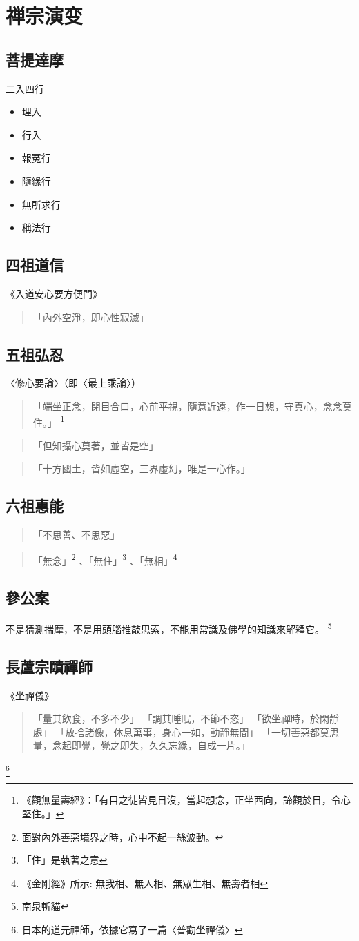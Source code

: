 \section{禅宗演变}

\subsection{菩提達摩}
二入四行
\begin{itemize}
  \item 理入
  \item 行入
\end{itemize}
\begin{itemize}
  \item 報冤行
  \item 隨緣行
  \item 無所求行
  \item 稱法行
\end{itemize}
\subsection{四祖道信}
《入道安心要方便門》
\begin{quote}
  「內外空淨，即心性寂滅」
\end{quote}
\subsection{五祖弘忍}
〈修心要論〉（即〈最上乘論〉）
\begin{quote}
  「端坐正念，閉目合口，心前平視，隨意近遠，作一日想，守真心，念念莫住。」
  \footnote{《觀無量壽經》：「有目之徒皆見日沒，當起想念，正坐西向，諦觀於日，令心堅住。」}
\end{quote}
\begin{quote}
  「但知攝心莫著，並皆是空」
\end{quote}
\begin{quote}
  「十方國土，皆如虛空，三界虛幻，唯是一心作。」
\end{quote}
\subsection{六祖惠能}
\begin{quote}
  「不思善、不思惡」
\end{quote}
\begin{quote}
  「無念」\footnote{面對內外善惡境界之時，心中不起一絲波動。}
  、「無住」\footnote{「住」是執著之意}
  、「無相」\footnote{《金剛經》所示: 無我相、無人相、無眾生相、無壽者相}
\end{quote}
\subsection{參公案}
不是猜測揣摩，不是用頭腦推敲思索，不能用常識及佛學的知識來解釋它。
\footnote{南泉斬貓}
\subsection{長蘆宗賾禪師}
《坐禪儀》
\begin{quote}
  「量其飲食，不多不少」
  「調其睡眠，不節不恣」
  「欲坐禪時，於閑靜處」
  「放捨諸像，休息萬事，身心一如，動靜無間」
  「一切善惡都莫思量，念起即覺，覺之即失，久久忘緣，自成一片。」
\end{quote}
\footnote{日本的道元禪師，依據它寫了一篇〈普勸坐禪儀〉}

